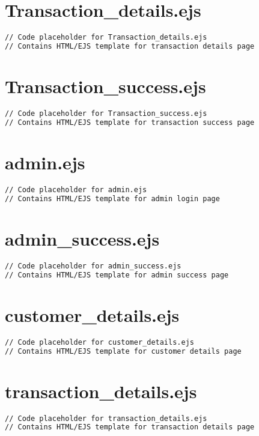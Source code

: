 \documentclass[12pt,a4paper]{report}
\begin{document}
\section{Transaction\_details.ejs}
\begin{lstlisting}[language=HTML]
// Code placeholder for Transaction_details.ejs
// Contains HTML/EJS template for transaction details page
\end{lstlisting}

\section{Transaction\_success.ejs}
\begin{lstlisting}[language=HTML]
// Code placeholder for Transaction_success.ejs
// Contains HTML/EJS template for transaction success page
\end{lstlisting}

\section{admin.ejs}
\begin{lstlisting}[language=HTML]
// Code placeholder for admin.ejs
// Contains HTML/EJS template for admin login page
\end{lstlisting}

\section{admin\_success.ejs}
\begin{lstlisting}[language=HTML]
// Code placeholder for admin_success.ejs
// Contains HTML/EJS template for admin success page
\end{lstlisting}

\section{customer\_details.ejs}
\begin{lstlisting}[language=HTML]
// Code placeholder for customer_details.ejs
// Contains HTML/EJS template for customer details page
\end{lstlisting}

\section{transaction\_details.ejs}
\begin{lstlisting}[language=HTML]
// Code placeholder for transaction_details.ejs
// Contains HTML/EJS template for transaction details page
\end{lstlisting}
\end{document}

